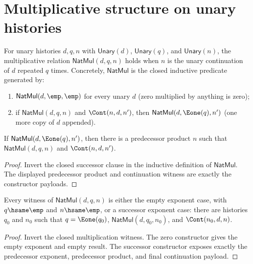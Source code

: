 \section{Multiplicative structure on unary histories}

\begin{definition}
\label{def:nat-multiplication}
For unary histories \(d, q, n\) with \(\mathsf{Unary}(d)\), \(\mathsf{Unary}(q)\), and \(\mathsf{Unary}(n)\), the multiplicative relation \(\mathsf{NatMul}(d, q, n)\) holds when \(n\) is the unary continuation of \(d\) repeated \(q\) times. Concretely, \(\mathsf{NatMul}\) is the closed inductive predicate generated by:
\begin{enumerate}
  \item \(\mathsf{NatMul}(d, \emp, \emp)\) for every unary \(d\) (zero multiplied by anything is zero);
  \item if \(\mathsf{NatMul}(d, q, n)\) and \(\Cont(n, d, n')\), then \(\mathsf{NatMul}(d, \Eone(q), n')\) (one more copy of \(d\) appended).
\end{enumerate}
\end{definition}
\begin{lemma}
\label{lem:nat-mul-succ-inversion}
If $\mathsf{NatMul}(d,\Eone(q),n')$, then there is a predecessor product
$n$ such that $\mathsf{NatMul}(d,q,n)$ and $\Cont(n,d,n')$.
\end{lemma}
\begin{proof}
Invert the closed successor clause in the inductive definition of
$\mathsf{NatMul}$. The displayed predecessor product and continuation
witness are exactly the constructor payloads.
\end{proof}
\begin{lemma}
\label{lem:nat-mul-exponent-result-cases}
Every witness of \(\mathsf{NatMul}(d,q,n)\) is either the empty exponent
case, with \(q\hsame\emp\) and \(n\hsame\emp\), or a successor exponent case:
there are histories \(q_0\) and \(n_0\) such that
\(q=\Eone(q_0)\), \(\mathsf{NatMul}(d,q_0,n_0)\), and
\(\Cont(n_0,d,n)\).
\end{lemma}
\begin{proof}
Invert the closed multiplication witness. The zero constructor gives the
empty exponent and empty result. The successor constructor exposes exactly the
predecessor exponent, predecessor product, and final continuation payload.
\end{proof}
